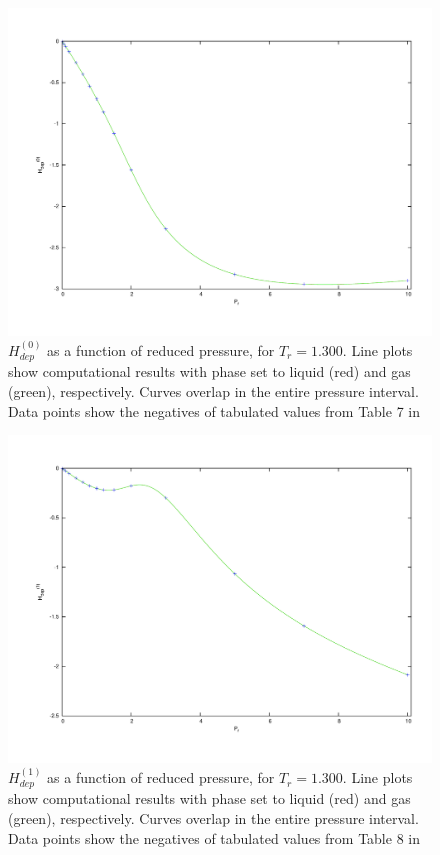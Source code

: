 \documentclass[english]{../thermomemo/thermomemo}
\numberwithin{equation}{section}
\begin{document}
\begin{figure}[h]
	\centering
	\includegraphics[trim = 1.5cm 2cm 0 1cm, clip = true, width=14cm]{Hdep0Tc130}
	\caption{$H_{dep}^{(0)}$ as a function of reduced pressure, for $T_r = 1.300$. Line plots show computational results with phase set to liquid (red) and gas (green), respectively. Curves overlap in the entire pressure interval. Data points show the negatives of tabulated values from Table 7 in \cite{LK}}
	\label{fig:Hdep0Tc130}
\end{figure}


\begin{figure}
	\centering
	\includegraphics[trim = 1.5cm 2cm 0 1cm, clip = true, width=13cm]{Hdep1Tc130}
	\caption{$H_{dep}^{(1)}$ as a function of reduced pressure, for $T_r = 1.300$. Line plots show computational results with phase set to liquid (red) and gas (green), respectively. Curves overlap in the entire pressure interval. Data points show the negatives of tabulated values from Table 8 in \cite{LK}}
	\label{fig:Hdep1Tc130}
\end{figure}
\end{document}
